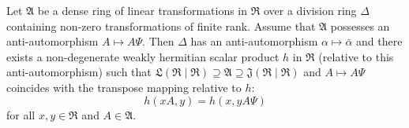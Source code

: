 Let $\mathfrak{A}$ be a dense ring of linear transformations in $\mathfrak{R}$ over a division ring $\Delta$ containing non-zero transformations of finite rank. Assume that $\mathfrak{A}$ possesses an anti-automorphism $A \mapsto A\Psi$. Then $\Delta$ has an anti-automorphism $\alpha \mapsto \bar{\alpha}$ and there exists a non-degenerate weakly hermitian scalar product $h$ in $\mathfrak{R}$ (relative to this anti-automorphism) such that $\mathfrak{L}(\mathfrak{R} \mid \mathfrak{R}) \supseteq \mathfrak{A} \supseteq \mathfrak{J}(\mathfrak{R} \mid \mathfrak{R})$ and $A \mapsto A\Psi$ coincides with the transpose mapping relative to $h$:
$$h(xA, y) = h(x, yA\Psi)$$
for all $x, y \in \mathfrak{R}$ and $A \in \mathfrak{A}$.
